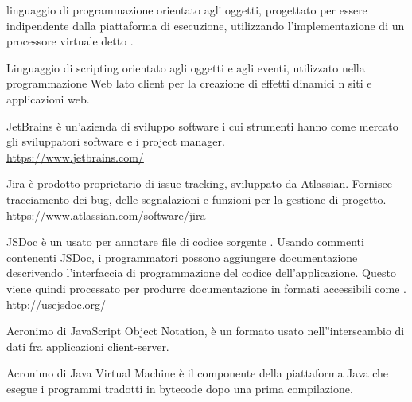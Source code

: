 linguaggio di programmazione orientato agli oggetti, progettato per essere indipendente dalla piattaforma di esecuzione, utilizzando l'implementazione di un processore virtuale detto .

Linguaggio di scripting orientato agli oggetti e agli eventi, utilizzato nella programmazione Web lato client per la creazione di effetti dinamici n siti e applicazioni web.

JetBrains è un'azienda di sviluppo software i cui strumenti hanno come mercato gli sviluppatori software e i project manager.\\
\url{https://www.jetbrains.com/}

Jira è prodotto proprietario di issue tracking, sviluppato da Atlassian. Fornisce tracciamento dei bug, delle segnalazioni e funzioni per la gestione di progetto.\\
\url{https://www.atlassian.com/software/jira}

JSDoc è un  usato per annotare file di codice sorgente . Usando commenti contenenti JSDoc, i programmatori possono aggiungere documentazione descrivendo l’interfaccia di programmazione del codice dell’applicazione. Questo viene quindi processato per produrre documentazione in formati accessibili come .\\
\url{http://usejsdoc.org/}

Acronimo di JavaScript Object Notation, \`e un formato usato nell''interscambio di dati fra applicazioni client-server.

Acronimo di Java Virtual Machine \`e il componente della piattaforma Java che esegue i programmi tradotti in bytecode dopo una prima compilazione.
\clearpage